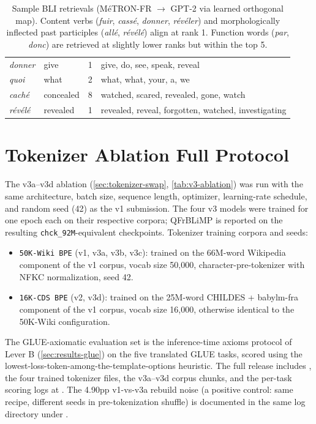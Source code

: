 \documentclass[11pt]{article}
\begin{document}
\begin{table}[h]
\begin{tabular}{l l c p{10cm}}
\emph{donner} & give & 1 & give, do, see, speak, reveal \\
\emph{quoi} & what & 2 & what, what, your, a, we \\
\emph{caché} & concealed & 8 & watched, scared, revealed, gone, watch \\
\emph{révélé} & revealed & 1 & revealed, reveal, forgotten, watched, investigating \\
\bottomrule
\end{tabular}
\caption{Sample BLI retrievals (MéTRON-FR $\to$ GPT-2 via learned orthogonal map). Content verbs (\emph{fuir}, \emph{cassé}, \emph{donner}, \emph{révéler}) and morphologically inflected past participles (\emph{allé}, \emph{révélé}) align at rank 1. Function words (\emph{par}, \emph{donc}) are retrieved at slightly lower ranks but within the top 5.}
\label{tab:bli-retrievals}
\end{table}

\section{Tokenizer Ablation Full Protocol}
\label{app:tokenizer}

The v3a--v3d ablation (\autoref{sec:tokenizer-swap}, \autoref{tab:v3-ablation}) was run with the same architecture, batch size, sequence length, optimizer, learning-rate schedule, and random seed (42) as the v1 submission. The four v3 models were trained for one epoch each on their respective corpora; QFrBLiMP is reported on the resulting \texttt{chck\_92M}-equivalent checkpoints. Tokenizer training corpora and seeds:

\begin{itemize}
\setlength{\itemsep}{0pt}
\item \texttt{50K-Wiki BPE} (v1, v3a, v3b, v3c): trained on the 66M-word Wikipedia component of the v1 corpus, vocab size 50{,}000, character-pre-tokenizer with NFKC normalization, seed 42.
\item \texttt{16K-CDS BPE} (v2, v3d): trained on the 25M-word CHILDES + babylm-fra component of the v1 corpus, vocab size 16{,}000, otherwise identical to the 50K-Wiki configuration.
\end{itemize}

\noindent The GLUE-axiomatic evaluation set is the inference-time axioms protocol of Lever B (\autoref{sec:results-glue}) on the five translated GLUE tasks, scored using the lowest-loss-token-among-the-template-options heuristic. The full release includes , the four trained tokenizer files, the v3a--v3d corpus chunks, and the per-task scoring logs at . The 4.90pp v1-vs-v3a rebuild noise (a positive control: same recipe, different seeds in pre-tokenization shuffle) is documented in the same log directory under .
\end{document}

